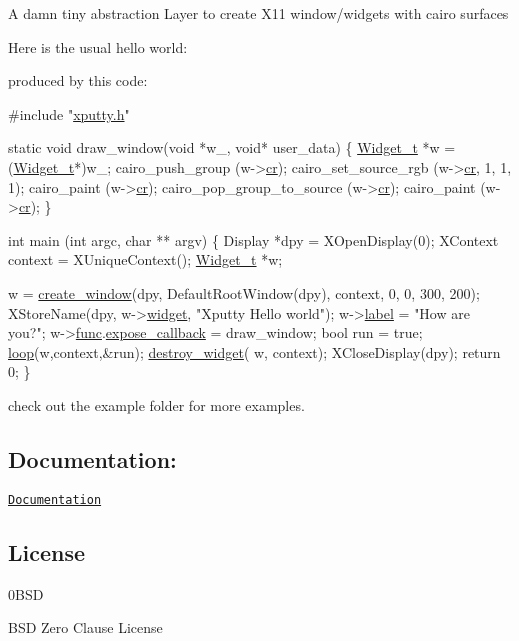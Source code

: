 A damn tiny abstraction Layer to create X11 window/widgets with cairo surfaces

Here is the usual hello world\+:



produced by this code\+:


\begin{DoxyCode}
\textcolor{preprocessor}{#include "\hyperlink{xputty_8h}{xputty.h}"}

\textcolor{keyword}{static} \textcolor{keywordtype}{void} draw\_window(\textcolor{keywordtype}{void} *w\_, \textcolor{keywordtype}{void}* user\_data) \{
    \hyperlink{structWidget__t}{Widget\_t} *w = (\hyperlink{structWidget__t}{Widget\_t}*)w\_;
    cairo\_push\_group (w->\hyperlink{structWidget__t_a26594f6ffabe98fc08f9207150fc9417}{cr});
    cairo\_set\_source\_rgb (w->\hyperlink{structWidget__t_a26594f6ffabe98fc08f9207150fc9417}{cr}, 1, 1, 1);
    cairo\_paint (w->\hyperlink{structWidget__t_a26594f6ffabe98fc08f9207150fc9417}{cr});
    cairo\_pop\_group\_to\_source (w->\hyperlink{structWidget__t_a26594f6ffabe98fc08f9207150fc9417}{cr});
    cairo\_paint (w->\hyperlink{structWidget__t_a26594f6ffabe98fc08f9207150fc9417}{cr});
\}

\textcolor{keywordtype}{int} main (\textcolor{keywordtype}{int} argc, \textcolor{keywordtype}{char} ** argv)
\{
    Display *dpy = XOpenDisplay(0);
    XContext context =  XUniqueContext();
    \hyperlink{structWidget__t}{Widget\_t} *w;

    w = \hyperlink{xwidget_8c_a9c5b8eaf662ac4fb7d2674bf7e89ab8c}{create\_window}(dpy, DefaultRootWindow(dpy), context, 0, 0, 300, 200);
    XStoreName(dpy, w->\hyperlink{structWidget__t_acb2bfb41674371ee1220a9d6a2d89fb1}{widget}, \textcolor{stringliteral}{"Xputty Hello world"});
    w->\hyperlink{structWidget__t_a952020107ac1f6d9a37b4f978f77b61c}{label} = \textcolor{stringliteral}{"How are you?"};
    w->\hyperlink{structWidget__t_a225b9a175e132994a5aa73b59a2911ad}{func}.\hyperlink{structFunc__t_ae4ba307ec29bfea83e1197aa750c1396}{expose\_callback} = draw\_window;
    \textcolor{keywordtype}{bool} run = \textcolor{keyword}{true};
    \hyperlink{xwidget_8c_a5dc619d89042819195db7e744dcd5f7d}{loop}(w,context,&run);
    \hyperlink{xwidget_8c_a540b0eefd6f19f487aa71d4c1798ac8c}{destroy\_widget}( w, context);
    XCloseDisplay(dpy);
    \textcolor{keywordflow}{return} 0;
\}
\end{DoxyCode}


check out the example folder for more examples.

\subsection*{Documentation\+:}

\href{https://brummer10.github.io/Xputty/html/index.html}{\tt Documentation}

\subsection*{License}

\begin{DoxyVerb}     0BSD 
\end{DoxyVerb}
 B\+SD Zero Clause License 